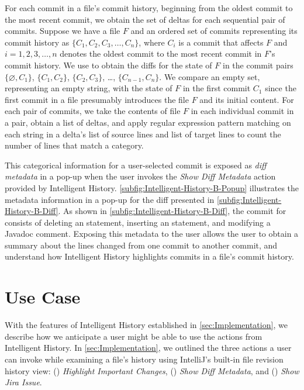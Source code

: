 For each commit in a file's commit history, beginning from the oldest commit to the most recent commit, 
we obtain the set of deltas for each sequential pair of commits.
Suppose we have a file $F$ and an ordered set of commits representing its commit history as 
$\{C_{1}, C_{2}, C_{3}, \dots, C_{n}\}$, where $C_{i}$ is a commit that affects $F$ and $i = 1, 2, 3, \dots, n$ denotes the oldest commit to the most recent commit in $F$'s commit history.
We use  to obtain the diffs for the state of $F$ in the commit pairs 
$\{\varnothing, C_{1}\}$, $\{C_{1}, C_{2}\}$, $\{C_{2}, C_{3}\}$, \dots, $\{C_{n-1}, C_{n}\}$.
We compare an empty set, representing an empty string, with the state of $F$ in the first commit $C_{1}$ since the first commit in a file presumably introduces the file $F$ and its initial content.
For each pair of commits, we take the contents of file $F$ in each individual commit in a pair, obtain a list of deltas, and apply regular expression pattern matching on each string in a delta's list of source lines and list of target lines to count the number of lines that match a category.

This categorical information for a user-selected commit is exposed as \emph{diff metadata} in a pop-up when the user invokes the \textit{Show Diff Metadata} action provided by Intelligent History.
\autoref{subfig:Intelligent-History-B-Popup} illustrates the metadata information in a pop-up for the diff presented in \autoref{subfig:Intelligent-History-B-Diff}.
As shown in \autoref{subfig:Intelligent-History-B-Diff}, the commit  for  consists of deleting an  statement, 
inserting an  statement, and modifying a Javadoc comment.
Exposing this metadata to the user allows the user to obtain a summary about the lines changed from one commit to another commit, 
and understand how Intelligent History highlights commits in a file's commit history.

\section{Use Case}
\label{sec:Use-Case}

With the features of Intelligent History established in \autoref{sec:Implementation}, we describe how we anticipate a user might be able to use the actions from Intelligent History. 
In \autoref{sec:Implementation}, we outlined the three actions a user can invoke while examining a file's history using IntelliJ's built-in file revision history view: 
() \textit{Highlight Important Changes}, 
() \textit{Show Diff Metadata}, and 
() \textit{Show Jira Issue}.

